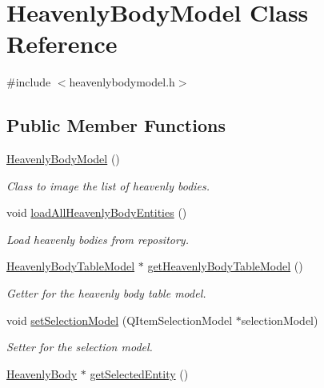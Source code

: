 \hypertarget{classHeavenlyBodyModel}{
\section{\-Heavenly\-Body\-Model \-Class \-Reference}
\label{d5/dae/classHeavenlyBodyModel}
}


{\ttfamily \#include $<$heavenlybodymodel.\-h$>$}

\subsection*{\-Public \-Member \-Functions}
\begin{DoxyCompactItemize}
\item 
\hyperlink{classHeavenlyBodyModel_a11620b7d75c0984a3d92dd430b28e498}{\-Heavenly\-Body\-Model} ()
\begin{DoxyCompactList}\small\item\em \-Class to image the list of heavenly bodies. \end{DoxyCompactList}\item 
void \hyperlink{classHeavenlyBodyModel_a6930a1f2cabc1b5c715faeefa255b9b6}{load\-All\-Heavenly\-Body\-Entities} ()
\begin{DoxyCompactList}\small\item\em \-Load heavenly bodies from repository. \end{DoxyCompactList}\item 
\hyperlink{classHeavenlyBodyTableModel}{\-Heavenly\-Body\-Table\-Model} $\ast$ \hyperlink{classHeavenlyBodyModel_a8237cf4cab0e6b3b154ba7e4f70f9d56}{get\-Heavenly\-Body\-Table\-Model} ()
\begin{DoxyCompactList}\small\item\em \-Getter for the heavenly body table model. \end{DoxyCompactList}\item 
void \hyperlink{classHeavenlyBodyModel_a13d3799b8e3ee537fdebe61a419160a9}{set\-Selection\-Model} (\-Q\-Item\-Selection\-Model $\ast$selection\-Model)
\begin{DoxyCompactList}\small\item\em \-Setter for the selection model. \end{DoxyCompactList}\item 
\hyperlink{classHeavenlyBody}{\-Heavenly\-Body} $\ast$ \hyperlink{classHeavenlyBodyModel_abc32e9a6e31b96a93d4dcd31e736be17}{get\-Selected\-Entity} ()
\item 

\end{DoxyCompactItemize}
